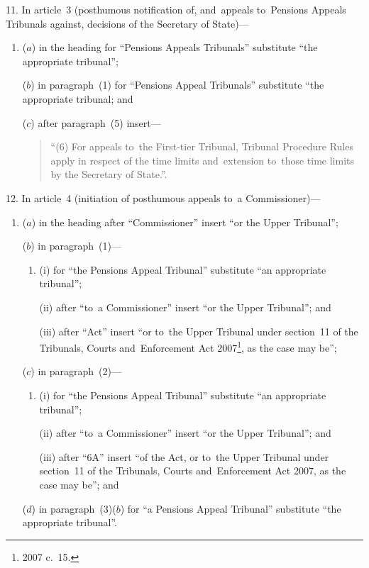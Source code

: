 \documentclass[12pt,a4paper]{article}
\begin{document}
11.  In article~3 (posthumous notification of, and~appeals to~Pensions Appeals Tribunals against, decisions of the Secretary of State)—
\begin{enumerate}\item[]
($a$) in the heading for “Pensions Appeals Tribunals” substitute “the appropriate tribunal”;

($b$) in paragraph~(1) for “Pensions Appeal Tribunals” substitute “the appropriate tribunal; and

($c$) after paragraph~(5) insert—
\begin{quotation}
“(6) For appeals to~the First-tier Tribunal, Tribunal Procedure Rules apply in respect of the time limits and~extension to~those time limits by the Secretary of State.”.
\end{quotation}
\end{enumerate}

\medskip

12.  In article~4 (initiation of posthumous appeals to~a Commissioner)—
\begin{enumerate}\item[]
($a$) in the heading after “Commissioner” insert “or the Upper Tribunal”;

($b$) in paragraph~(1)—
\begin{enumerate}\item[]
(i) for “the Pensions Appeal Tribunal” substitute “an appropriate tribunal”;

(ii) after “to~a Commissioner” insert “or the Upper Tribunal”; and

(iii) after “Act” insert “or to~the Upper Tribunal under section~11 of the Tribunals, Courts and~Enforcement Act 2007\footnote{2007 c.~15.}, as the case may be”;
\end{enumerate}

($c$) in paragraph~(2)—
\begin{enumerate}\item[]
(i) for “the Pensions Appeal Tribunal” substitute “an appropriate tribunal”;

(ii) after “to~a Commissioner” insert “or the Upper Tribunal”; and

(iii) after “6A” insert “of the Act, or to~the Upper Tribunal under section~11 of the Tribunals, Courts and~Enforcement Act 2007, as the case may be”; and
\end{enumerate}

($d$) in paragraph~(3)($b$)  for “a Pensions Appeal Tribunal” substitute “the appropriate tribunal”.
\end{enumerate}
\end{document}
